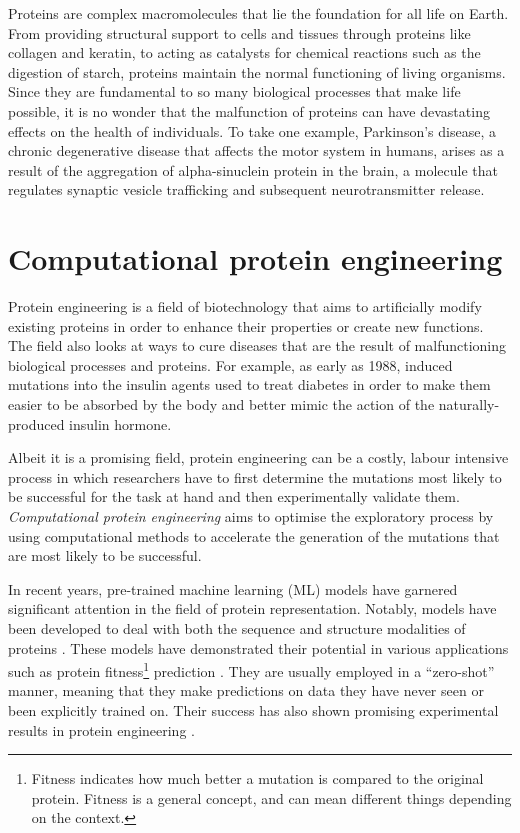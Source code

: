 Proteins are complex macromolecules that lie the foundation for all life on Earth. From providing structural support to cells and tissues through proteins like collagen and keratin, to acting as catalysts for chemical reactions such as the digestion of starch, proteins maintain the normal functioning of living organisms. Since they are fundamental to so many biological processes that make life possible, it is no wonder that the malfunction of proteins can have devastating effects on the health of individuals. To take one example, Parkinson's disease, a chronic degenerative disease that affects the motor system in humans, arises as a result of the aggregation of alpha-sinuclein protein in the brain, a molecule that regulates synaptic vesicle trafficking and subsequent neurotransmitter release.

\section{Computational protein engineering}
Protein engineering is a field of biotechnology that aims to artificially modify existing proteins in order to enhance their properties or create new functions. The field also looks at ways to cure diseases that are the result of malfunctioning biological processes and proteins. For example, as early as 1988, \citet{insulin} induced mutations into the insulin agents used to treat diabetes in order to make them easier to be absorbed by the body and better mimic the action of the naturally-produced insulin hormone. 

Albeit it is a promising field, protein engineering can be a costly, labour intensive process in which researchers have to first determine the mutations most likely to be successful for the task at hand and then experimentally validate them. \textit{Computational protein engineering} aims to optimise the exploratory process by using computational methods to accelerate the generation of the mutations that are most likely to be successful. 

In recent years, pre-trained machine learning (ML) models have garnered significant attention in the field of protein representation. Notably, models have been developed to deal with both the sequence and structure modalities of proteins \cite{ESM, prottrans, gearnet}. These models have demonstrated their potential in various applications such as protein fitness\footnote{Fitness indicates how much better a mutation is compared to the original protein. Fitness is a general concept, and can mean different things depending on the context.} prediction \cite{ESM-1v, tranception}. They are usually employed in a ``zero-shot'' manner, meaning that they make predictions on data they have never seen or been explicitly trained on.
Their success has also shown promising experimental results in protein engineering  \cite{mutcompute, Lu2022}.


